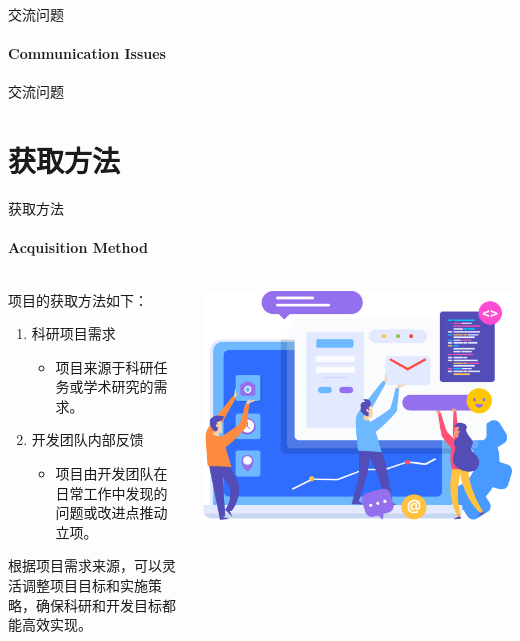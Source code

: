 \documentclass{beamer}
\begin{document}

\begin{frame}[fragile]{交流问题}
\framesubtitle{Communication Issues}
交流问题
\end{frame}


\section{获取方法}


\begin{frame}[fragile]{获取方法}
\framesubtitle{Acquisition Method}
\begin{columns}
\begin{column}{0.45\textwidth}
项目的获取方法如下：
\begin{enumerate}
\item 科研项目需求
\begin{itemize}
\item 项目来源于科研任务或学术研究的需求。
\end{itemize}
\item 开发团队内部反馈
\begin{itemize}
\item 项目由开发团队在日常工作中发现的问题或改进点推动立项。
\end{itemize}
\end{enumerate}
根据项目需求来源，可以灵活调整项目目标和实施策略，确保科研和开发目标都能高效实现。
\end{column}
\begin{column}{0.45\textwidth}
\includegraphics[width=\textwidth]
{figures/acquisition_method}
\end{column}
\end{columns}
\end{frame}


\backmatter
\end{document}
